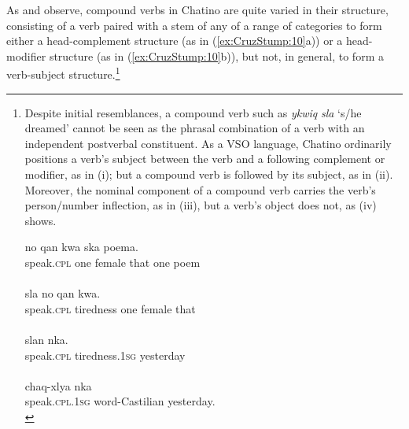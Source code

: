\documentclass[output=paper]{langsci/langscibook}
\begin{document}
As \cite{Rasch02} and \cite{CruzWoodbury2013} observe, compound verbs in Chatino are quite varied in their structure, consisting of a verb paired with a stem of any of a range of categories to form either a head-complement structure (as in (\ref{ex:CruzStump:10}a)) or a head-modifier structure (as in (\ref{ex:CruzStump:10}b)), but not, in general, to form a verb-subject structure.\footnote{Despite initial resemblances, a compound verb such as \emph{ykwiq}  \emph{sla} `s/he dreamed' cannot be seen as the phrasal combination of a verb with an independent postverbal constituent.   As a VSO language, Chatino ordinarily positions a verb's subject between the verb and a following complement or modifier, as in (i); but a compound verb is followed by its subject, as in (ii).  Moreover, the nominal component of a compound verb carries the verb's person/number inflection, as in (iii), but a verb's object does not, as (iv) shows.

\ea
\label{ex:CruzStump:i} {{no} } { {qan} } {{kwa}} {{ska} } {{poema}.}\\
	 {speak.\textsc{cpl}} {one } { female} {that} {one} {poem}\\
	\\


\ex \label{ex:CruzStump:ii} {{sla} } {{no} } { {qan} } {{kwa}.}\\
	 {speak.\textsc{cpl}} {tiredness} {one } { female} {that}\\
	\\


\ex  \label{ex:CruzStump:iii} {{slan}} {{nka}.}\\
	 {speak.\textsc{cpl}} {tiredness.\textsc{1sg}} {yesterday}\\
	\\


\ex \label{ex:CruzStump:iv} {{chaq}-{xlya} } {{nka}}\\
	 {speak.\textsc{cpl.1sg}} {word-Castilian} {yesterday.}\\
\z}

\begin{exe}
\ex\label{ex:CruzStump:10}
\begin{xlist}
	\end{xlist}
\end{exe}
\end{document}
